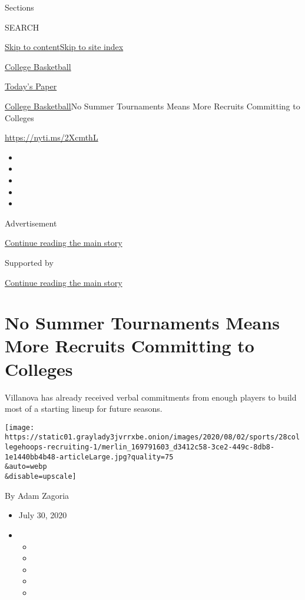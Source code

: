 Sections

SEARCH

\protect\hyperlink{site-content}{Skip to
content}\protect\hyperlink{site-index}{Skip to site index}

\href{https://www.nytimes3xbfgragh.onion/section/sports/ncaabasketball}{College
Basketball}

\href{https://myaccount.nytimes3xbfgragh.onion/auth/login?response_type=cookie\&client_id=vi}{}

\href{https://www.nytimes3xbfgragh.onion/section/todayspaper}{Today's
Paper}

\href{/section/sports/ncaabasketball}{College Basketball}\textbar{}No
Summer Tournaments Means More Recruits Committing to Colleges

\url{https://nyti.ms/2XcmthL}

\begin{itemize}
\item
\item
\item
\item
\item
\end{itemize}

Advertisement

\protect\hyperlink{after-top}{Continue reading the main story}

Supported by

\protect\hyperlink{after-sponsor}{Continue reading the main story}

\hypertarget{no-summer-tournaments-means-more-recruits-committing-to-colleges}{%
\section{No Summer Tournaments Means More Recruits Committing to
Colleges}\label{no-summer-tournaments-means-more-recruits-committing-to-colleges}}

Villanova has already received verbal commitments from enough players to
build most of a starting lineup for future seasons.

\texttt{[image: https://static01.graylady3jvrrxbe.onion/images/2020/08/02/sports/28collegehoops-recruiting-1/merlin\_169791603\_d3412c58-3ce2-449c-8db8-1e1440bb4b48-articleLarge.jpg?quality=75\\\&auto=webp\\\&disable=upscale]}

By Adam Zagoria

\begin{itemize}
\item
  July 30, 2020
\item
  \begin{itemize}
  \item
  \item
  \item
  \item
  \item
  \end{itemize}
\end{itemize}


